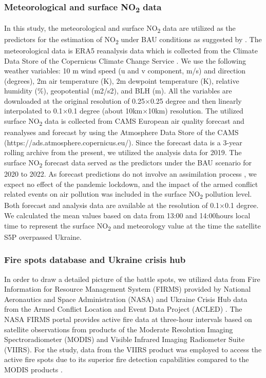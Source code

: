 \subsubsection*{Meteorological and surface NO\textsubscript{2} data}
In this study, the meteorological and surface NO\textsubscript{2} data are utilized as the predictors for the estimation of NO\textsubscript{2} under BAU conditions as suggested by \citep{barre2021estimating}. The meteorological data is ERA5 reanalysis data which is collected from the Climate Data Store of the Copernicus Climate Change Service \citep{hersbach2018era5}. We use the following weather variables: 10 m wind speed  (u and v component, m/s) and direction (degrees), 2m air temperature (K), 2m dewpoint temperature (K), relative humidity (\%), geopotential (m2/s2), and BLH (m). All the variables are downloaded at the original resolution of 0.25$\times$0.25 degree and then linearly interpolated to 0.1$\times$0.1 degree (about 10km$\times$10km) resolution. The utilized surface NO\textsubscript{2} data is collected from CAMS European air quality forecast and reanalyses and forecast \citep{marecal2015regional} by using the Atmosphere Data Store of the CAMS (https://ads.atmosphere.copernicus.eu/). Since the forecast data is a 3-year rolling archive from the present, we utilized the analysis data for 2019. The surface NO\textsubscript{2} forecast data served as the predictors under the BAU scenario for 2020 to 2022. As forecast predictions do not involve an assimilation process \citep{barre2021estimating}, we expect no effect of the pandemic lockdown, and the impact of the armed conflict related events on air pollution was included in the surface NO\textsubscript{2} pollution level. Both forecast and analysis data are available at the resolution of 0.1$\times$0.1 degree. We calculated the mean values based on data from 13:00 and 14:00hours local time to represent the surface NO\textsubscript{2} and meteorology value at the time the satellite S5P overpassed Ukraine. \par
\subsubsection*{Fire spots database and Ukraine crisis hub}
In order to draw a detailed picture of the battle spots, we utilized data from Fire Information for Resource Management System (FIRMS) provided by National Aeronautics and Space Administration (NASA) and Ukraine Crisis Hub data from the Armed Conflict Location and Event Data Project (ACLED) \citep{raleigh2010introducing}. The NASA FIRMS portal provides active fire data at three-hour intervals based on satellite observations from products of the Moderate Resolution Imaging Spectroradiometer (MODIS) and Visible Infrared Imaging Radiometer Suite (VIIRS). For the study, data from the VIIRS product was employed to access the active fire spots due to its superior fire detection capabilities compared to the MODIS products \citep{csiszar2014active,schroeder2014new}. \par

